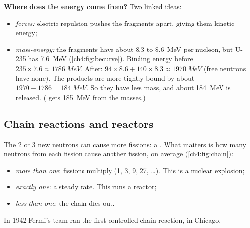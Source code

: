\textbf{Where does the energy come from?} Two linked ideas:
\begin{itemize}
  \item \emph{forces:} electric repulsion pushes the fragments apart, giving them
        kinetic energy;
  \item \emph{mass-energy:} the fragments have about 8.3 to \qty{8.6}{MeV} per nucleon,
        but U-235 has \qty{7.6}{MeV} (\cref{ch4:fig:becurve}). Binding energy before:
        $235 \times 7.6 \approx \qty{1786}{MeV}$. After:
        $94 \times 8.6 + 140 \times 8.3 \approx \qty{1970}{MeV}$ (free neutrons have
        none). The products are more tightly bound by about
        $1970 - 1786 = \qty{184}{MeV}$. So they have less mass, and about
        \qty{184}{MeV} is released. ( gets \qty{185}{MeV} from
        the masses.)
\end{itemize}

\subsection{Chain reactions and reactors}

The 2 or 3 new neutrons can cause more fissions: a . What
matters is how many neutrons from each fission cause another fission, on average
(\cref{ch4:fig:chain}):
\begin{itemize}
  \item \emph{more than one}: fissions multiply (1, 3, 9, 27, \ldots). This
         is a nuclear explosion;
  \item \emph{exactly one}: a steady rate. This  runs a
        reactor;
  \item \emph{less than one}: the chain dies out.
\end{itemize}
In 1942 Fermi's team ran the first controlled chain reaction, in Chicago.

